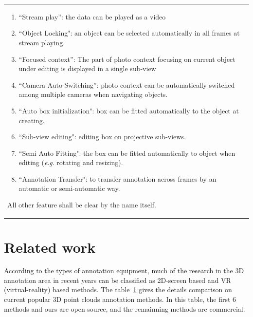 \documentclass[letterpaper, 10 pt, conference]{ieeeconf}  %
\begin{document}
\begin{table}[ht]
\begin{tabular}{p{17.5cm}}
\begin{enumerate}
			\item ``Stream play'': the data can be played as a video
			\item ``Object Locking": an object can be selected automatically in all frames at stream  playing. 
			
			\item ``Focused context'': The part of photo context focusing on current object under editing is displayed in a single sub-view
			
			\item ``Camera Auto-Switching'': photo context can be automatically switched among multiple cameras when navigating objects. 
			
			\item ``Auto box initialization": box can be fitted automatically to the object at creating.
			
			\item ``Sub-view editing": editing box on projective sub-views.
			
			\item ``Semi Auto Fitting": the box can be fitted  automatically  to object when editing (\textit{e}.\textit{g}. rotating and resizing).
			
			\item ``Annotation Transfer": to transfer annotation across frames by an automatic or semi-automatic way.
			
		\end{enumerate}

		All other feature shall be clear by the name itself.
		
	\end{tabular}
	\label{tab:annotationMethods}
	\vspace{-0.5cm}
\end{table}


\section{Related work}
\label{Realtedwork}
According to the types of annotation equipment, much of the research in the 3D annotation area in recent years can be classified as 2D-screen based and VR (virtual-reality) based methods. The table~\ref{tab:annotationMethods} gives the details comparison on current popular 3D point clouds annotation methods. In this table, the first 6 methods and ours are open source, and the remainning methods are commercial.
\end{document}
